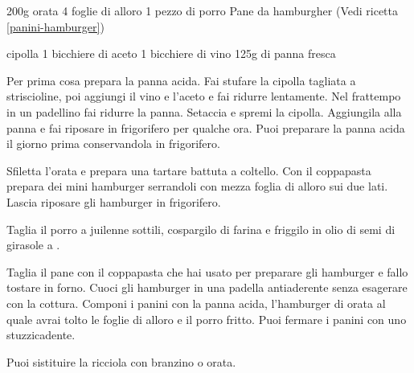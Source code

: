 \begin{ingreds}
	200g orata
	4 foglie di alloro
	1 pezzo di porro
	Pane da hamburgher (Vedi ricetta \ref{panini-hamburger})
	
\columnbreak
{} cipolla
	1 bicchiere di aceto
	1 bicchiere di vino
	125g di panna fresca
\end{ingreds}

\begin{method}
Per prima cosa prepara la panna acida. Fai stufare la cipolla tagliata a striscioline, poi aggiungi il vino e l'aceto e fai ridurre lentamente. Nel frattempo in un padellino fai ridurre la panna. Setaccia e spremi la cipolla. Aggiungila alla panna e fai riposare in frigorifero per qualche ora. Puoi preparare la panna acida il giorno prima conservandola in frigorifero.

Sfiletta l'orata e prepara una tartare battuta a coltello. Con il coppapasta prepara dei mini hamburger serrandoli con mezza foglia di alloro sui due lati. Lascia riposare gli hamburger in frigorifero.

Taglia il porro a juilenne sottili, cospargilo di farina e friggilo in olio di semi di girasole a .

Taglia il pane con il coppapasta che hai usato per preparare gli hamburger e fallo tostare in forno. Cuoci gli hamburger in una padella antiaderente senza esagerare con la cottura. Componi i panini con la panna acida, l'hamburger di orata al quale avrai tolto le foglie di alloro e il porro fritto. Puoi fermare i panini con uno stuzzicadente.
\end {method}
	\begin{note}
		Puoi sistituire la ricciola con branzino o orata.
	\end{note}
